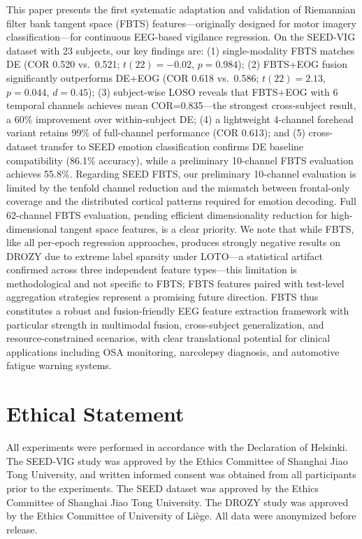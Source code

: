 \documentclass{iopjournal}
\begin{document}
This paper presents the first systematic adaptation and validation of Riemannian filter bank tangent space (FBTS) features---originally designed for motor imagery classification---for continuous EEG-based vigilance regression. On the SEED-VIG dataset with 23 subjects, our key findings are: (1) single-modality FBTS matches DE (COR 0.520 vs.\ 0.521; $t(22)=-0.02$, $p=0.984$); (2) FBTS+EOG fusion significantly outperforms DE+EOG (COR 0.618 vs.\ 0.586; $t(22)=2.13$, $p=0.044$, $d=0.45$); (3) subject-wise LOSO reveals that FBTS+EOG with 6 temporal channels achieves mean COR=0.835---the strongest cross-subject result, a 60\% improvement over within-subject DE; (4) a lightweight 4-channel forehead variant retains 99\% of full-channel performance (COR 0.613); and (5) cross-dataset transfer to SEED emotion classification confirms DE baseline compatibility (86.1\% accuracy), while a preliminary 10-channel FBTS evaluation achieves 55.8\%. Regarding SEED FBTS, our preliminary 10-channel evaluation is limited by the tenfold channel reduction and the mismatch between frontal-only coverage and the distributed cortical patterns required for emotion decoding. Full 62-channel FBTS evaluation, pending efficient dimensionality reduction for high-dimensional tangent space features, is a clear priority. We note that while FBTS, like all per-epoch regression approaches, produces strongly negative results on DROZY due to extreme label sparsity under LOTO---a statistical artifact confirmed across three independent feature types---this limitation is methodological and not specific to FBTS; FBTS features paired with test-level aggregation strategies represent a promising future direction. FBTS thus constitutes a robust and fusion-friendly EEG feature extraction framework with particular strength in multimodal fusion, cross-subject generalization, and resource-constrained scenarios, with clear translational potential for clinical applications including OSA monitoring, narcolepsy diagnosis, and automotive fatigue warning systems.


\section*{Ethical Statement}
All experiments were performed in accordance with the Declaration of Helsinki. The SEED-VIG study was approved by the Ethics Committee of Shanghai Jiao Tong University, and written informed consent was obtained from all participants prior to the experiments. The SEED dataset was approved by the Ethics Committee of Shanghai Jiao Tong University. The DROZY study was approved by the Ethics Committee of University of Liège. All data were anonymized before release.
\end{document}
